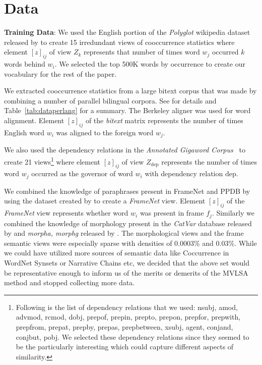 \section{Data}
\label{sec:data}
\noindent\textbf{Training Data}: We used the English portion of the \textit{Polyglot} wikipedia dataset
released by \cite{al2013polyglot} to create 15 irredundant views of
cooccurrence statistics where element $[z]_{ij}$ of view $Z_k$
represents that number of times word $w_j$ occurred $k$ words behind
$w_i$.
We selected the top 500K words by occurrence to 
create our vocabulary for the rest of the paper.

We extracted cooccurrence statistics from a large bitext corpus that was made by combining a
number of parallel bilingual corpora. See \cite{ganitkevitch2013ppdb} for details and
Table~\ref{tab:dataperlang} for a summary. The Berkeley aligner was used for word alignment. Element
$[z]_{ij}$ of the \textit{bitext} matrix represents the number of times English
word $w_i$ was aligned to the foreign word $w_j$.

We also used the dependency relations in the \textit{Annotated
  Gigaword Corpus}~\cite{annotatedGigaword12} to create 21
views\footnote{Following is the list of dependency relations that we
  used: nsubj, amod, advmod, rcmod, dobj, prep\xline{}of,
  prep\xline{}in, prep\xline{}to, prep\xline{}on, prep\xline{}for,
  prep\xline{}with, prep\xline{}from, prep\xline{}at, prep\xline{}by,
  prep\xline{}as, prep\xline{}between, xsubj, agent, conj\xline{}and,
  conj\xline{}but, pobj. We selected these dependency relations since
  they seemed to be the particularly interesting which could capture
  different aspects of similarity.}  where element $[z]_{ij}$ of view
$Z_{\textrm{dep}}$ represents the number of times word $w_j$ occurred
as the governor of word $w_i$ with dependency relation $\textrm{dep}$.

We combined the knowledge of paraphrases present in FrameNet and PPDB by
using the dataset created by  to create a
\textit{FrameNet} view. Element $[z]_{ij}$ of the \textit{FrameNet}
view represents whether word $w_i$ was present in frame
$f_j$. Similarly we combined the knowledge of morphology present in
the \textit{CatVar} database released by  and
\textit{morpha, morphg} released by .
The morphological views and the frame semantic views were especially
sparse with densities of 0.0003\% and 0.03\%. While we could have utilized more sources of semantic data like
Coccurrence in WordNet Synsets or Narrative Chains etc, we decided
that the above set would be representative enough to inform us of the
merits or demerits of the MVLSA method and stopped collecting more data.

